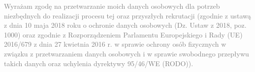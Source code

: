 \documentclass[10pt,a4paper,sans]{article}
\begin{document}
\begin{minipage}[t]{13.5cm}
    \vfill %

    \begin{center}
        \scriptsize \textcolor{gray}{
        Wyrażam zgodę na przetwarzanie moich danych osobowych dla potrzeb niezbędnych do realizacji procesu tej oraz przyszłych rekrutacji (zgodnie z ustawą z dnia 10 maja 2018 roku o ochronie danych osobowych (Dz. Ustaw z 2018, poz. 1000) oraz zgodnie z Rozporządzeniem Parlamentu Europejskiego i Rady (UE) 2016/679 z dnia 27 kwietnia 2016 r. w sprawie ochrony osób fizycznych w związku z przetwarzaniem danych osobowych i w sprawie swobodnego przepływu takich danych oraz uchylenia dyrektywy 95/46/WE (RODO)).
        }
    \end{center}

    \vspace{0.5cm}
\end{minipage}
\end{document}
